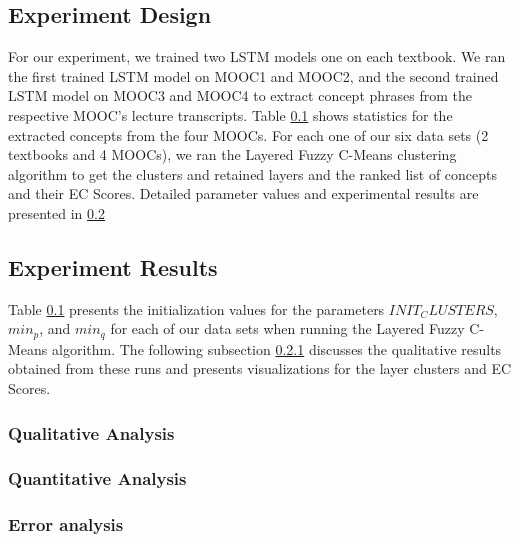 
\subsection{Experiment Design}
For our experiment, we trained two LSTM models one on each textbook. We ran the first trained LSTM model on MOOC1 and MOOC2, and the second trained LSTM model on MOOC3 and MOOC4 to extract concept phrases from the respective MOOC's lecture transcripts. Table \ref{} shows statistics for the extracted concepts from the four MOOCs.
For each one of our six data sets (2 textbooks and 4 MOOCs), we ran the Layered Fuzzy C-Means clustering algorithm to get the clusters and retained layers and the ranked list of concepts and their EC Scores. Detailed parameter values and experimental results are presented in \ref{exp_results}

\subsection{Experiment Results}\label{exp_results}
Table \ref{} presents the initialization values for the parameters $INIT_CLUSTERS$, $min_p$, and $min_q$ for each of our data sets when running the Layered Fuzzy C-Means algorithm. The following subsection \ref{qualitative} discusses the qualitative results obtained from these runs and presents visualizations for the layer clusters and EC Scores.

\subsubsection{Qualitative Analysis}\label{qualitative}



\subsubsection{Quantitative Analysis}\label{quantitative}


\subsubsection{Error analysis}\label{error}

